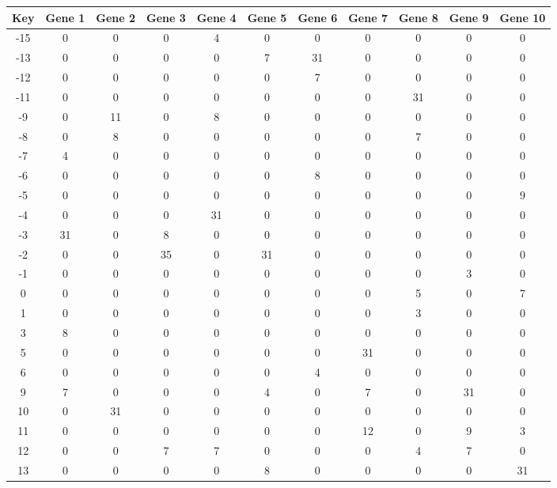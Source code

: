 \begin{tabular}{|c|c|c|c|c|c|c|c|c|c|c|}
\hline
Key & Gene 1 & Gene 2 & Gene 3 & Gene 4 & Gene 5 & Gene 6 & Gene 7 & Gene 8 & Gene 9 & Gene 10 \\
\hline
-15 & 0 & 0 & 0 & 4 & 0 & 0 & 0 & 0 & 0 & 0 \\
-13 & 0 & 0 & 0 & 0 & 7 & 31 & 0 & 0 & 0 & 0 \\
-12 & 0 & 0 & 0 & 0 & 0 & 7 & 0 & 0 & 0 & 0 \\
-11 & 0 & 0 & 0 & 0 & 0 & 0 & 0 & 31 & 0 & 0 \\
-9 & 0 & 11 & 0 & 8 & 0 & 0 & 0 & 0 & 0 & 0 \\
-8 & 0 & 8 & 0 & 0 & 0 & 0 & 0 & 7 & 0 & 0 \\
-7 & 4 & 0 & 0 & 0 & 0 & 0 & 0 & 0 & 0 & 0 \\
-6 & 0 & 0 & 0 & 0 & 0 & 8 & 0 & 0 & 0 & 0 \\
-5 & 0 & 0 & 0 & 0 & 0 & 0 & 0 & 0 & 0 & 9 \\
-4 & 0 & 0 & 0 & 31 & 0 & 0 & 0 & 0 & 0 & 0 \\
-3 & 31 & 0 & 8 & 0 & 0 & 0 & 0 & 0 & 0 & 0 \\
-2 & 0 & 0 & 35 & 0 & 31 & 0 & 0 & 0 & 0 & 0 \\
-1 & 0 & 0 & 0 & 0 & 0 & 0 & 0 & 0 & 3 & 0 \\
0 & 0 & 0 & 0 & 0 & 0 & 0 & 0 & 5 & 0 & 7 \\
1 & 0 & 0 & 0 & 0 & 0 & 0 & 0 & 3 & 0 & 0 \\
3 & 8 & 0 & 0 & 0 & 0 & 0 & 0 & 0 & 0 & 0 \\
5 & 0 & 0 & 0 & 0 & 0 & 0 & 31 & 0 & 0 & 0 \\
6 & 0 & 0 & 0 & 0 & 0 & 4 & 0 & 0 & 0 & 0 \\
9 & 7 & 0 & 0 & 0 & 4 & 0 & 7 & 0 & 31 & 0 \\
10 & 0 & 31 & 0 & 0 & 0 & 0 & 0 & 0 & 0 & 0 \\
11 & 0 & 0 & 0 & 0 & 0 & 0 & 12 & 0 & 9 & 3 \\
12 & 0 & 0 & 7 & 7 & 0 & 0 & 0 & 4 & 7 & 0 \\
13 & 0 & 0 & 0 & 0 & 8 & 0 & 0 & 0 & 0 & 31 \\
\hline
\end{tabular}